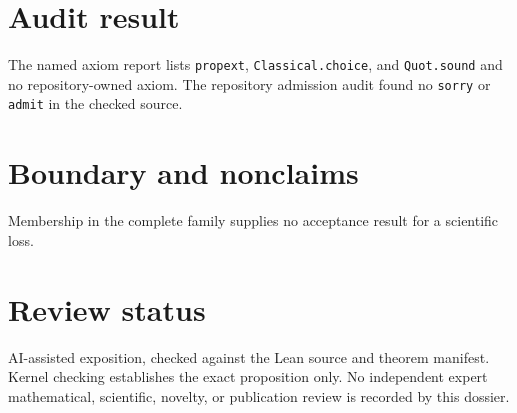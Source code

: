 \documentclass[11pt]{article}
\begin{document}
\section{Audit result}
The named axiom report lists \texttt{propext}, \texttt{Classical.choice}, and
\texttt{Quot.sound} and no repository-owned axiom.  The repository admission audit found no
\texttt{sorry} or \texttt{admit} in the checked source.

\section{Boundary and nonclaims}
Membership in the complete family supplies no acceptance result for a scientific loss.

\section{Review status}
AI-assisted exposition, checked against the Lean source and theorem manifest.  Kernel checking
establishes the exact proposition only.  No independent expert mathematical, scientific,
novelty, or publication review is recorded by this dossier.
\end{document}

